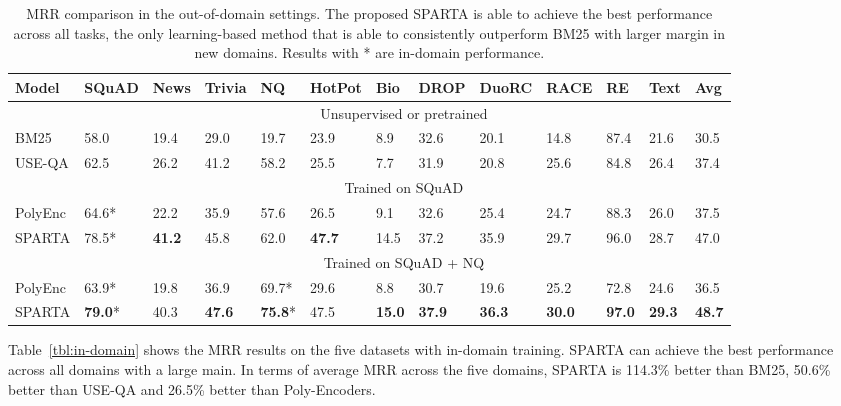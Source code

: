 \documentclass[11pt,a4paper]{article}
\begin{document}
\begin{table*}[!ht]
\centering
\small
\begin{tabular}[width=16cm]{l|lllll|llllll|l} \hline
 \textbf{Model}   & \textbf{SQuAD} & \textbf{News}  & \textbf{Trivia} & \textbf{NQ}    & \textbf{HotPot} & \textbf{Bio}   & \textbf{DROP}  & \textbf{DuoRC} & \textbf{RACE}  & \textbf{RE}    & \textbf{Text}  & \textbf{Avg}   \\ \hline
 & \multicolumn{12}{c}{Unsupervised or pretrained}                                              \\ \hline
BM25      & 58.0 & 19.4 & 29.0  & 19.7  & 23.9  & 8.9 & 32.6 & 20.1 & 14.8 & 87.4 & 21.6 & 30.5 \\
USE-QA    & 62.5 & 26.2 & 41.2  & 58.2 & 25.5  & 7.7 & 31.9 & 20.8 & 25.6 & 84.8 & 26.4 & 37.4 \\ \hline
          & \multicolumn{12}{c}{Trained on SQuAD}                                              \\ \hline
PolyEnc & 64.6* & 22.2 & 35.9  & 57.6 & 26.5  & 9.1 & 32.6 & 25.4 & 24.7 & 88.3 & 26.0 & 37.5  \\
SPARTA    & 78.5* & \textbf{41.2} & 45.8  & 62.0 & \textbf{47.7}  & 14.5 & 37.2 & 35.9 & 29.7 & 96.0& 28.7 & 47.0 \\\hline
          & \multicolumn{12}{c}{Trained on SQuAD + NQ}                                              \\ \hline
PolyEnc & 63.9* & 19.8 & 36.9  & 69.7* & 29.6  & 8.8 & 30.7 & 19.6 & 25.2 & 72.8 & 24.6 & 36.5 \\
SPARTA    &\textbf{79.0}*  & 40.3  & \textbf{47.6} & \textbf{75.8}*  & 47.5 & \textbf{15.0} &\textbf{ 37.9} & \textbf{36.3} & \textbf{30.0} & \textbf{97.0} & \textbf{29.3} & \textbf{48.7} \\\hline
\end{tabular}
\caption{MRR comparison in the out-of-domain settings. The proposed SPARTA is able to achieve the best performance across all tasks, the only learning-based method that is able to consistently outperform BM25 with larger margin in new domains. Results with * are in-domain performance.}
\label{tbl:out-domain}
\end{table*}

Table~\ref{tbl:in-domain} shows the MRR results on the five datasets with in-domain training. SPARTA can achieve the best performance across all domains with a large main. In terms of average MRR across the five domains, SPARTA is 114.3\% better than BM25, 50.6\% better than USE-QA and 26.5\% better than Poly-Encoders. 
\end{document}
